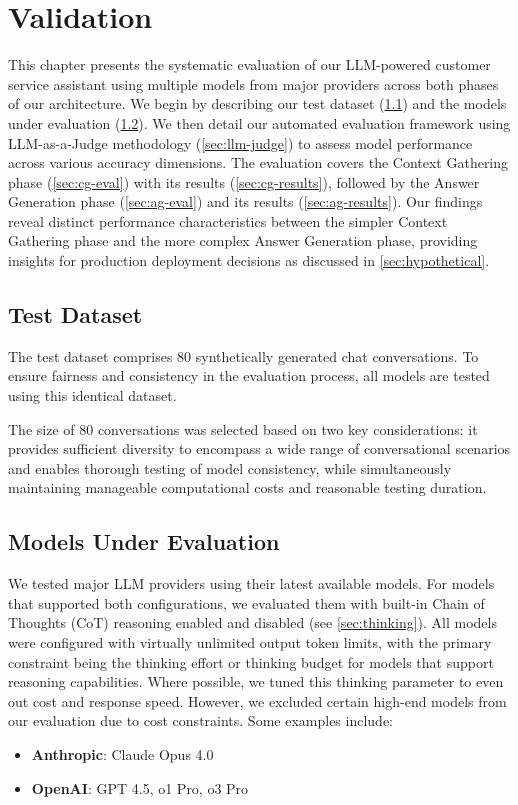 \chapter{Validation}
\label{cha:validation}

This chapter presents the systematic evaluation of our LLM-powered customer service assistant using multiple models from major providers across both phases of our architecture.
We begin by describing our test dataset (\cref{sec:dataset}) and the models under evaluation (\cref{sec:models}).
We then detail our automated evaluation framework using LLM-as-a-Judge methodology (\cref{sec:llm-judge}) to assess model performance across various accuracy dimensions.
The evaluation covers the Context Gathering phase (\cref{sec:cg-eval}) with its results (\cref{sec:cg-results}), followed by the Answer Generation phase (\cref{sec:ag-eval}) and its results (\cref{sec:ag-results}).
Our findings reveal distinct performance characteristics between the simpler Context Gathering phase and the more complex Answer Generation phase, providing insights for production deployment decisions as discussed in \cref{sec:hypothetical}.

\section{Test Dataset}
\label{sec:dataset}

The test dataset comprises 80 synthetically generated chat conversations.
To ensure fairness and consistency in the evaluation process, all models are tested using this identical dataset.

The size of 80 conversations was selected based on two key considerations: it provides sufficient diversity to encompass a wide range of conversational scenarios and enables thorough testing of model consistency, while simultaneously maintaining manageable computational costs and reasonable testing duration.

\section{Models Under Evaluation}
\label{sec:models}

We tested major LLM providers using their latest available models.
For models that supported both configurations, we evaluated them with built-in Chain of Thoughts (CoT) reasoning enabled and disabled (see \cref{sec:thinking}).
All models were configured with virtually unlimited output token limits, with the primary constraint being the thinking effort or thinking budget for models that support reasoning capabilities.
Where possible, we tuned this thinking parameter to even out cost and response speed.
However, we excluded certain high-end models from our evaluation due to cost constraints.
Some examples include:
\begin{itemize}
    \item \textbf{Anthropic}: Claude Opus 4.0 \cite{anthropic_pricing}
    \item \textbf{OpenAI}: GPT 4.5, o1 Pro, o3 Pro \cite{openai_pricing}
\end{itemize}

